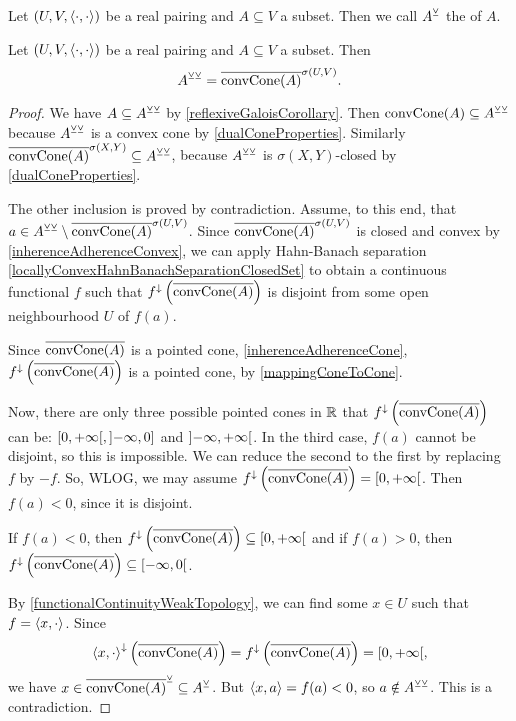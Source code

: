 \begin{definition}
Let $\sSet{U,V,\pair{\cdot,\cdot}}$ be a real pairing and $A\subseteq V$ a subset. Then we call $A^\veebar$ the  of $A$.
\end{definition}

\begin{proposition}
Let $\sSet{U,V,\pair{\cdot,\cdot}}$ be a real pairing and $A\subseteq V$ a subset. Then
\[ A^{\veebar\veebar} = \overline{\operatorname{convCone}(A)}^{\sigma(U,V)}. \]
\end{proposition}
\begin{proof}
We have $A \subseteq A^{\veebar\veebar}$ by \ref{reflexiveGaloisCorollary}. Then $\operatorname{convCone}(A) \subseteq A^{\veebar\veebar}$ because $A^{\veebar\veebar}$ is a convex cone by \ref{dualConeProperties}. Similarly $\overline{\operatorname{convCone}(A)}^{\sigma(X,Y)} \subseteq A^{\veebar\veebar}$, because $A^{\veebar\veebar}$ is $\sigma(X,Y)$-closed by \ref{dualConeProperties}.

The other inclusion is proved by contradiction. Assume, to this end, that $a\in A^{\veebar\veebar} \setminus \overline{\operatorname{convCone}(A)}^{\sigma(U,V)}$. Since $\overline{\operatorname{convCone}(A)}^{\sigma(U,V)}$ is closed and convex by \ref{inherenceAdherenceConvex}, we can apply Hahn-Banach separation \ref{locallyConvexHahnBanachSeparationClosedSet} to obtain a continuous functional $f$ such that $f^\downarrow\left(\overline{\operatorname{convCone}(A)}\right)$ is disjoint from some open neighbourhood $U$ of $f(a)$.

Since $\overline{\operatorname{convCone}(A)}$ is a pointed cone, \ref{inherenceAdherenceCone}, $f^\downarrow\left(\overline{\operatorname{convCone}(A)}\right)$ is a pointed cone, by \ref{mappingConeToCone}.

Now, there are only three possible pointed cones in $\mathbb{R}$ that $f^\downarrow\left(\overline{\operatorname{convCone}(A)}\right)$ can be: $\interval[co]{0, +\infty}, \interval[oc]{-\infty, 0}$ and $\interval[o]{-\infty, +\infty}$. In the third case, $f(a)$ cannot be disjoint, so this is impossible. We can reduce the second to the first by replacing $f$ by $-f$. So, WLOG, we may assume $f^\imf\left(\overline{\convCone(A)}\right) = \interval[co]{0, +\infty}$. Then $f(a) < 0$, since it is disjoint.

If $f(a) < 0$, then $f^\imf\left(\overline{\convCone(A)}\right)\subseteq \interval[co]{0,+\infty}$ and if $f(a) > 0$, then $f^\imf\left(\overline{\convCone(A)}\right)\subseteq \interval[co]{-\infty, 0}$.

By \ref{functionalContinuityWeakTopology}, we can find some $x\in U$ such that $f = \left\langle x,\cdot \right\rangle$. Since
\[ \pair{x,\cdot}^\imf\left(\overline{\convCone(A)}\right) = f^\imf\left(\overline{\convCone(A)}\right) = \interval[co]{0, +\infty}, \]
we have $x\in \overline{\operatorname{convCone}(A)}^\veebar \subseteq A^\veebar$. But $\left\langle x, a \right\rangle = f(a) < 0$, so $a\notin A^{\veebar\veebar}$. This is a contradiction.
\end{proof}
